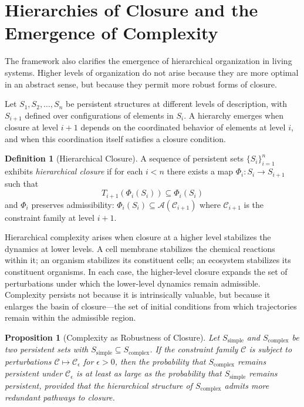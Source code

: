 \documentclass[12pt, a4paper, oneside]{article}
\theoremstyle{plain}
\newtheorem{proposition}[theorem]{Proposition}
\theoremstyle{definition}
\newtheorem{definition}[theorem]{Definition}
\theoremstyle{remark}
\newcommand{\C}{\mathcal{C}}
\newcommand{\A}{\mathcal{A}}
\newcommand{\T}{T}
\begin{document}
\section{Hierarchies of Closure and the Emergence of Complexity}

The framework also clarifies the emergence of hierarchical organization in living systems. Higher levels of organization do not arise because they are more optimal in an abstract sense, but because they permit more robust forms of closure.

Let $S_1, S_2, \ldots, S_n$ be persistent structures at different levels of description, with $S_{i+1}$ defined over configurations of elements in $S_i$. A hierarchy emerges when closure at level $i+1$ depends on the coordinated behavior of elements at level $i$, and when this coordination itself satisfies a closure condition.

\begin{definition}[Hierarchical Closure]
A sequence of persistent sets $\{S_i\}_{i=1}^n$ exhibits \emph{hierarchical closure} if for each $i < n$ there exists a map $\Phi_i : S_i \to S_{i+1}$ such that
\begin{equation}
\T_{i+1}(\Phi_i(S_i)) \subseteq \Phi_i(S_i)
\end{equation}
and $\Phi_i$ preserves admissibility: $\Phi_i(S_i) \subseteq \A(\C_{i+1})$ where $\C_{i+1}$ is the constraint family at level $i+1$.
\end{definition}

Hierarchical complexity arises when closure at a higher level stabilizes the dynamics at lower levels. A cell membrane stabilizes the chemical reactions within it; an organism stabilizes its constituent cells; an ecosystem stabilizes its constituent organisms. In each case, the higher-level closure expands the set of perturbations under which the lower-level dynamics remain admissible. Complexity persists not because it is intrinsically valuable, but because it enlarges the basin of closure---the set of initial conditions from which trajectories remain within the admissible region.

\begin{proposition}[Complexity as Robustness of Closure]
\label{prop:complexity}
Let $S_\mathrm{simple}$ and $S_\mathrm{complex}$ be two persistent sets with $S_\mathrm{simple} \subseteq S_\mathrm{complex}$. If the constraint family $\C$ is subject to perturbations $\C \mapsto \C_\epsilon$ for $\epsilon > 0$, then the probability that $S_\mathrm{complex}$ remains persistent under $\C_\epsilon$ is at least as large as the probability that $S_\mathrm{simple}$ remains persistent, provided that the hierarchical structure of $S_\mathrm{complex}$ admits more redundant pathways to closure.
\end{proposition}
\end{document}
